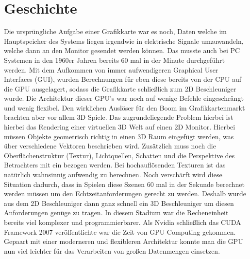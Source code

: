 \documentclass[10pt,twocolumn]{article}          %
\begin{document}
\section{Geschichte}
Die urspr\"ungliche Aufgabe einer Grafikkarte war es noch, Daten welche im Hauptspeicher des Systems liegen irgendwie in elektrische Signale umzuwandeln, welche dann an den Monitor gesendet werden k\"onnen. 
Das musste auch bei PC Systemen in den 1960er Jahren bereits 60 mal in der Minute durchgef\"uhrt werden. 
Mit dem Aufkommen von immer aufwendigeren Graphical User Interfaces (GUI), wurden Berechnungen f\"ur eben diese bereits von der CPU auf die GPU ausgelagert, sodass die Grafikkarte schließlich zum 2D Beschleuniger wurde.
Die Architektur dieser GPU's war noch auf wenige Befehle eingeschr\"angt und wenig flexibel.
Den wirklichen Ausl\"oser f\"ur den Boom im Grafikkartenmarkt brachten aber vor allem 3D Spiele. \cite{conf}
Das zugrundeliegende Problem hierbei ist hierbei das Rendering einer virtuellen 3D Welt auf einen 2D Monitor.
Hierbei m\"ussen Objekte geometrisch richtig in einen 3D Raum eingef\"ugt werden, was \"uber verschiedene Vektoren beschrieben wird. 
Zus\"atzlich muss noch die Oberfl\"achenstruktur (Textur), Lichtquellen, Schatten und die Perspektive des Betrachters mit ein bezogen werden.
Bei hochaufl\"osenden Texturen ist das nat\"urlich wahnsinnig aufwendig zu berechnen.
Noch versch\"arft wird diese Situation dadurch, dass in Spielen diese Szenen 60 mal in der Sekunde berechnet werden m\"ussen um den Echtzeitanforderungen gerecht zu werden.
Deshalb wurde aus dem 2D Beschleuniger dann ganz schnell ein 3D Beschleuniger um diesen Anforderungen gen\"uge zu tragen.
In diesem Stadium war die Recheneinheit bereits viel komplexer und programmierbarer. \cite{tr}
Als Nvidia schließlich das CUDA Framework 2007 ver\"offentlichte war die Zeit von GPU Computing gekommen.
Gepaart mit einer moderneren und flexibleren Architektur konnte man die GPU nun viel leichter f\"ur das Verarbeiten von großen Datenmengen einsetzen.
\end{document}
